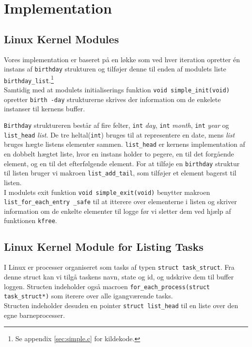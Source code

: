 \documentclass[main.tex]{subfile}
\begin{document}
\section{Implementation}
\subsection{Linux Kernel Modules}
Vores implementation er baseret på en løkke som ved hver iteration opretter én instans af \texttt{birthday} strukturen og tilføjer denne til enden af modulets liste \texttt{birthday\_list}.\footnote{Se appendix \ref{sec:simple.c} for kildekode.}\\

Samtidig med at modulets initialiserings funktion \texttt{void simple\_init(void)} opretter \texttt{birth -day} strukturerne skrives der information om de enkelete instanser til kernens buffer. 

\texttt{Birthday} struktureren består af fire felter, \texttt{int} \emph{day}, \texttt{int} \emph{month}, \texttt{int} \emph{year} og \texttt{list\_head} \emph{list}. De tre heltal(\texttt{int}) bruges til at representere en date, mens \emph{list} bruges hægte listens elementer sammen. \texttt{list\_head} er kernens implementation af en dobbelt hægtet liste, hvor en instans holder to pegere, en til det forgående element, og en til det efterfølgende element. For at tilføje en \texttt{birthday} struktur til listen bruger vi makroen \texttt{list\_add\_tail}, som tilføjer et element bagerst til listen.\\

I modulets exit funktion \texttt{void simple\_exit(void)} benytter makroen \texttt{list\_for\_each\_entry \_safe} til at itterere over elementerne i listen og skriver information om de enkelte elementer til logge før vi sletter dem ved hjælp af funktionen \texttt{kfree}. 

\subsection{Linux Kernel Module for Listing Tasks}
I Linux er processer organiseret som tasks af typen \texttt{struct task\_struct}. Fra denne struct kan vi tilgå taskens navn, state og id, og udskrive dem til buffer loggen. Structen indeholder også macroen \texttt{for\_each\_process(struct task\_struct*)} som iterere over alle igangværende tasks.\\

Structen indeholder desuden en pointer \texttt{struct list\_head} til en liste over den egne barneprocesser.\\
\end{document}
